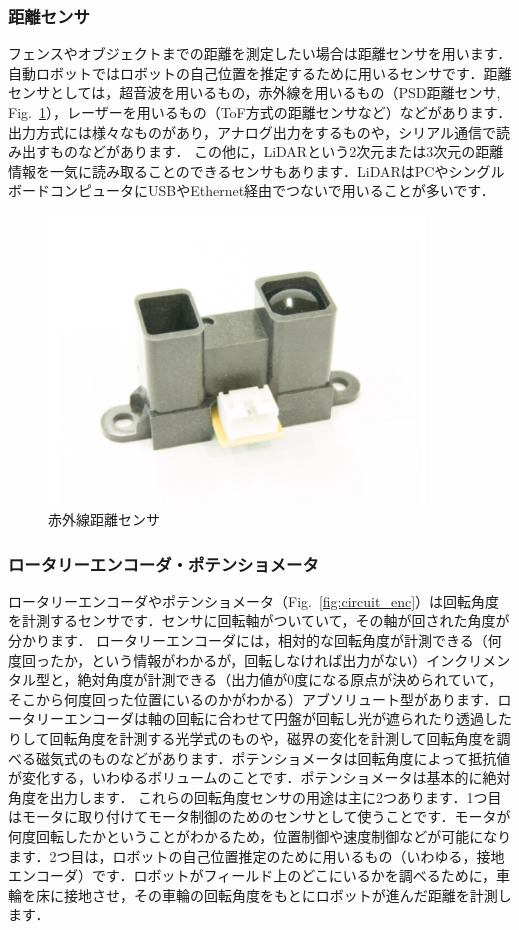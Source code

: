 \subsubsection{距離センサ}

フェンスやオブジェクトまでの距離を測定したい場合は距離センサを用います．自動ロボットではロボットの自己位置を推定するために用いるセンサです．距離センサとしては，超音波を用いるもの，赤外線を用いるもの（PSD距離センサ, Fig.~\ref{fig:circuit_psd}），レーザーを用いるもの（ToF方式の距離センサなど）などがあります．
出力方式には様々なものがあり，アナログ出力をするものや，シリアル通信で読み出すものなどがあります．
この他に，LiDARという2次元または3次元の距離情報を一気に読み取ることのできるセンサもあります．LiDARはPCやシングルボードコンピュータにUSBやEthernet経由でつないで用いることが多いです．

\begin{figure}[h]
  \centering
  \includegraphics[width=10cm]{circuit/fig/psd.png}
  \caption{赤外線距離センサ}
  \label{fig:circuit_psd}
\end{figure}

\subsubsection{ロータリーエンコーダ・ポテンショメータ}

ロータリーエンコーダやポテンショメータ（Fig.~\ref{fig:circuit_enc}）は回転角度を計測するセンサです．センサに回転軸がついていて，その軸が回された角度が分かります．
ロータリーエンコーダには，相対的な回転角度が計測できる（何度回ったか，という情報がわかるが，回転しなければ出力がない）インクリメンタル型と，絶対角度が計測できる（出力値が0度になる原点が決められていて，そこから何度回った位置にいるのかがわかる）アブソリュート型があります．ロータリーエンコーダは軸の回転に合わせて円盤が回転し光が遮られたり透過したりして回転角度を計測する光学式のものや，磁界の変化を計測して回転角度を調べる磁気式のものなどがあります．ポテンショメータは回転角度によって抵抗値が変化する，いわゆるボリュームのことです．ポテンショメータは基本的に絶対角度を出力します．
これらの回転角度センサの用途は主に2つあります．1つ目はモータに取り付けてモータ制御のためのセンサとして使うことです．モータが何度回転したかということがわかるため，位置制御や速度制御などが可能になります．2つ目は，ロボットの自己位置推定のために用いるもの（いわゆる，接地エンコーダ）です．ロボットがフィールド上のどこにいるかを調べるために，車輪を床に接地させ，その車輪の回転角度をもとにロボットが進んだ距離を計測します．


